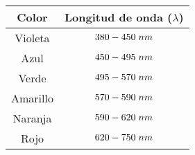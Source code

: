 \documentclass[12pt]{report}
\begin{document}
\begin{table}[h!]
  \centering
  \begin{tabular}{|c|c|}
    \hline
    Color & Longitud de onda ($\lambda$)\\
    \hline
    Violeta & $380-450\hspace{1mm}nm$ \\
    \hline
    Azul & $450-495\hspace{1mm} nm$ \\
    \hline
    Verde & $495-570\hspace{1mm} nm$ \\
    \hline
    Amarillo & $570-590\hspace{1mm} nm$ \\
    \hline
    Naranja & $590-620\hspace{1mm} nm$ \\
    \hline
    Rojo & $620-750\hspace{1mm} nm$ \\
    \hline
  \end{tabular}
\end{table}
\end{document}
